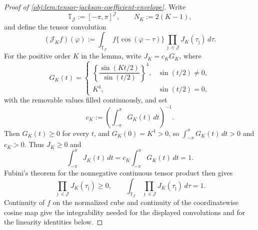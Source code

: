 \begin{proof}[Proof of \cref{obj:lem:tensor-jackson-coefficient-envelope}]
Write
\[
\mathbb T_{\mathcal J}:=[-\pi,\pi]^{\mathcal J},
\qquad
N_K:=2(K-1),
\]
and define the tensor convolution
\[
(\mathcal J_K f)(\varphi)
:=
\int_{\mathbb T_{\mathcal J}}
f\{\cos(\varphi-\tau)\}
\prod_{\jmath\in\mathcal J}J_K(\tau_\jmath)\,d\tau .
\]
For the positive order \(K\) in the lemma, write \(J_K=c_KG_K\), where
\[
G_K(t)=
\begin{cases}
\left\{\dfrac{\sin(Kt/2)}{\sin(t/2)}\right\}^{4},& \sin(t/2)\ne0,\\[1ex]
K^4,& \sin(t/2)=0,
\end{cases}
\]
with the removable values filled continuously, and set
\[
c_K:=\left(\int_{-\pi}^{\pi}G_K(t)\,dt\right)^{-1}.
\]
Then \(G_K(t)\ge0\) for every \(t\), and \(G_K(0)=K^4>0\), so \(\int_{-\pi}^{\pi}G_K(t)\,dt>0\) and \(c_K>0\).  Thus \(J_K\ge0\) and
\[
\int_{-\pi}^{\pi}J_K(t)\,dt
=
c_K\int_{-\pi}^{\pi}G_K(t)\,dt
=1 .
\]
Fubini's theorem for the nonnegative continuous tensor product then gives
\[
\prod_{\jmath\in\mathcal J}J_K(\tau_\jmath)\ge 0,
\qquad
\int_{\mathbb T_{\mathcal J}}
\prod_{\jmath\in\mathcal J}J_K(\tau_\jmath)\,d\tau=1 .
\]
Continuity of \(f\) on the normalized cube and continuity of the coordinatewise cosine map give the integrability needed for the displayed convolutions and for the linearity identities below. %


\end{proof}
